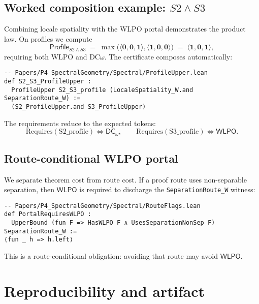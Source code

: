 \documentclass[11pt]{article}
\newcommand{\WLPO}{\mathsf{WLPO}}
\newcommand{\DCw}{\mathsf{DC}_{\omega}}
\newcommand{\hzero}{\mathbf{0}}
\newcommand{\hone}{\mathbf{1}}
\newcommand{\Profile}{\mathsf{Profile}}
\newcommand{\WLPOonly}{\langle \hone,\hzero,\hzero\rangle}
\newcommand{\DCwonly}{\langle \hzero,\hzero,\hone\rangle}
\newcommand{\lean}[1]{\texttt{#1}}
\theoremstyle{plain}
\theoremstyle{definition}
\theoremstyle{remark}
\begin{document}
\subsection{Worked composition example: \(S2 \wedge S3\)}
Combining locale spatiality with the WLPO portal demonstrates the product law.
On profiles we compute
\[
  \Profile_{S2 \wedge S3}
  \;=\; \max\!\big(\DCwonly,\WLPOonly\big)
  \;=\; \langle \hone,\hzero,\hone\rangle,
\]
requiring both WLPO and DC$\omega$. The certificate composes automatically:

\begin{verbatim}
-- Papers/P4_SpectralGeometry/Spectral/ProfileUpper.lean
def S2_S3_ProfileUpper :
  ProfileUpper S2_S3_profile (LocaleSpatiality_W.and SeparationRoute_W) :=
  (S2_ProfileUpper.and S3_ProfileUpper)
\end{verbatim}

The requirements reduce to the expected tokens:
\[
  \mathrm{Requires}(\mathrm{S2\_profile}) \iff \DCw,\qquad
  \mathrm{Requires}(\mathrm{S3\_profile}) \iff \WLPO.
\]

\subsection{Route-conditional WLPO portal}
We separate theorem cost from route cost. If a proof route uses non-separable
separation, then \(\WLPO\) is required to discharge the \lean{SeparationRoute\_W}
witness:

\begin{verbatim}
-- Papers/P4_SpectralGeometry/Spectral/RouteFlags.lean
def PortalRequiresWLPO :
  UpperBound (fun F => HasWLPO F ∧ UsesSeparationNonSep F) SeparationRoute_W :=
⟨fun _ h => h.left⟩
\end{verbatim}

This is a route-conditional obligation: avoiding that route may avoid \(\WLPO\).

\section{Reproducibility and artifact}
\end{document}
